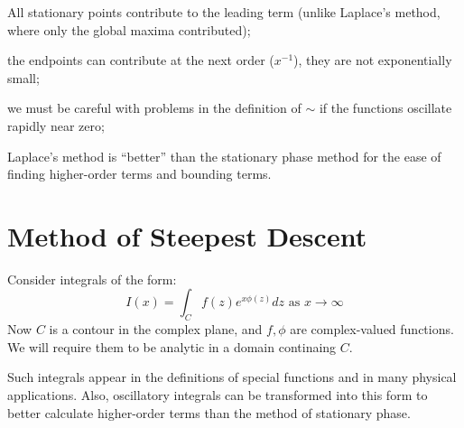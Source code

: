 \documentclass[../Main.tex]{subfiles}
\begin{document}
\begin{remarks}
    \item All stationary points contribute to the leading term (unlike Laplace's method, where only the global maxima contributed);
    \item the endpoints can contribute at the next order ($x^{-1}$), they are not exponentially small;
    \item we must be careful with problems in the definition of $\sim$ if the functions oscillate rapidly near zero;
    \item Laplace's method is ``better'' than the stationary phase method for the ease of finding higher-order terms and bounding terms.
\end{remarks}
\section{Method of Steepest Descent}
Consider integrals of the form:
\begin{equation*}
    I(x) = \int_C f(z) e^{x\phi(z)} dz \text{ as } x \to \infty
\end{equation*}
Now $C$ is a contour in the complex plane, and $f, \phi$ are complex-valued functions. We will require them to be analytic in a domain continaing $C$.

Such integrals appear in the definitions of special functions and in many physical applications. Also, oscillatory integrals can be transformed into this form to better calculate higher-order terms than the method of stationary phase.
\end{document}
